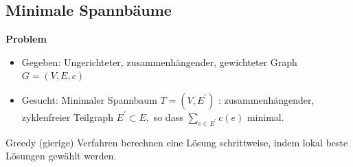 \vspace{-4pt}
\begin{sectionbox}
\subsection{Minimale Spannbäume}\smallskip
\textbf{Problem}\par
\begin{itemize}
    \item Gegeben: Ungerichteter, zusammenhängender, gewichteter Graph $G=(V, E, c)$
    \item Gesucht: Minimaler Spannbaum $T=\left(V, E^{\prime}\right)$ : zusammenhängender, zyklenfreier Teilgraph $E^{\prime} \subset E,$ so dass $\sum_{e \in E^{\prime}} c(e)$ minimal.
\end{itemize}
Greedy (gierige) Verfahren berechnen eine Lösung schrittweise, indem lokal beste Lösungen gewählt werden.\par\vspace{10px}
\end{sectionbox}
\vspace{-4pt}
